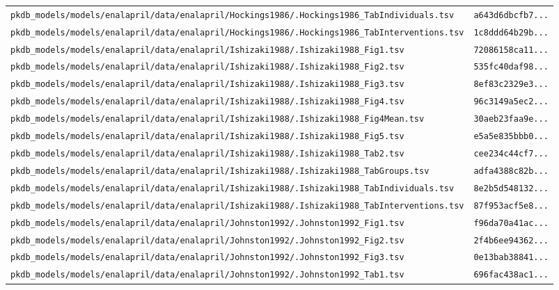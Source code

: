 \documentclass{article}
\begin{document}
\begin{longtable}{ll}
\texttt{pkdb\_models/models/enalapril/data/enalapril/Hockings1986/.Hockings1986\_TabIndividuals.tsv} & \texttt{a643d6dbcfb7...} \\
\texttt{pkdb\_models/models/enalapril/data/enalapril/Hockings1986/.Hockings1986\_TabInterventions.tsv} & \texttt{1c8ddd64b29b...} \\
\texttt{pkdb\_models/models/enalapril/data/enalapril/Ishizaki1988/.Ishizaki1988\_Fig1.tsv} & \texttt{72086158ca11...} \\
\texttt{pkdb\_models/models/enalapril/data/enalapril/Ishizaki1988/.Ishizaki1988\_Fig2.tsv} & \texttt{535fc40daf98...} \\
\texttt{pkdb\_models/models/enalapril/data/enalapril/Ishizaki1988/.Ishizaki1988\_Fig3.tsv} & \texttt{8ef83c2329e3...} \\
\texttt{pkdb\_models/models/enalapril/data/enalapril/Ishizaki1988/.Ishizaki1988\_Fig4.tsv} & \texttt{96c3149a5ec2...} \\
\texttt{pkdb\_models/models/enalapril/data/enalapril/Ishizaki1988/.Ishizaki1988\_Fig4Mean.tsv} & \texttt{30aeb23faa9e...} \\
\texttt{pkdb\_models/models/enalapril/data/enalapril/Ishizaki1988/.Ishizaki1988\_Fig5.tsv} & \texttt{e5a5e835bbb0...} \\
\texttt{pkdb\_models/models/enalapril/data/enalapril/Ishizaki1988/.Ishizaki1988\_Tab2.tsv} & \texttt{cee234c44cf7...} \\
\texttt{pkdb\_models/models/enalapril/data/enalapril/Ishizaki1988/.Ishizaki1988\_TabGroups.tsv} & \texttt{adfa4388c82b...} \\
\texttt{pkdb\_models/models/enalapril/data/enalapril/Ishizaki1988/.Ishizaki1988\_TabIndividuals.tsv} & \texttt{8e2b5d548132...} \\
\texttt{pkdb\_models/models/enalapril/data/enalapril/Ishizaki1988/.Ishizaki1988\_TabInterventions.tsv} & \texttt{87f953acf5e8...} \\
\texttt{pkdb\_models/models/enalapril/data/enalapril/Johnston1992/.Johnston1992\_Fig1.tsv} & \texttt{f96da70a41ac...} \\
\texttt{pkdb\_models/models/enalapril/data/enalapril/Johnston1992/.Johnston1992\_Fig2.tsv} & \texttt{2f4b6ee94362...} \\
\texttt{pkdb\_models/models/enalapril/data/enalapril/Johnston1992/.Johnston1992\_Fig3.tsv} & \texttt{0e13bab38841...} \\
\texttt{pkdb\_models/models/enalapril/data/enalapril/Johnston1992/.Johnston1992\_Tab1.tsv} & \texttt{696fac438ac1...} \\

\end{longtable}
\end{document}
